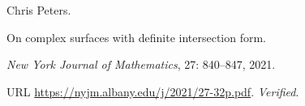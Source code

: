 Chris Peters.

\newblock On complex surfaces with definite intersection form.

\newblock \emph{New York Journal of Mathematics}, 27: 840--847, 2021.

\newblock URL \url{https://nyjm.albany.edu/j/2021/27-32p.pdf}.
\newblock \emph{Verified}.

